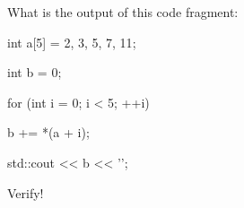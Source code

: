 What is the output of this code fragment:



\begin{consolethree}[escapeinside=||]

int a[5] = {2, 3, 5, 7, 11};

int b = 0;

for (int i = 0; i < 5; ++i)

{

    b += *(a + i);

}

std::cout << b << '\n';

\end{consolethree}



Verify!

